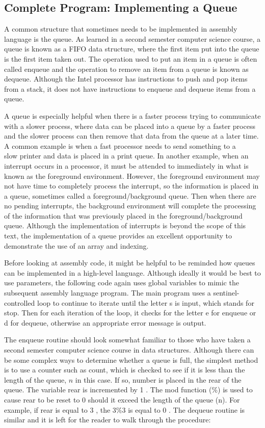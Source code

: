 \documentclass[10pt]{article}
\begin{document}
\subsection*{Complete Program: Implementing a Queue}
A common structure that sometimes needs to be implemented in assembly language is the queue. As learned in a second semester computer science course, a queue is known as a FIFO data structure, where the first item put into the queue is the first item taken out. The operation used to put an item in a queue is often called enqueue and the operation to remove an item from a queue is known as dequeue. Although the Intel processor has instructions to push and pop items from a stack, it does not have instructions to enqueue and dequeue items from a queue.

A queue is especially helpful when there is a faster process trying to communicate with a slower process, where data can be placed into a queue by a faster process and the slower process can then remove that data from the queue at a later time. A common example is when a fast processor needs to send something to a\\
slow printer and data is placed in a print queue. In another example, when an interrupt occurs in a processor, it must be attended to immediately in what is known as the foreground environment. However, the foreground environment may not have time to completely process the interrupt, so the information is placed in a queue, sometimes called a foreground/background queue. Then when there are no pending interrupts, the background environment will complete the processing of the information that was previously placed in the foreground/background queue. Although the implementation of interrupts is beyond the scope of this text, the implementation of a queue provides an excellent opportunity to demonstrate the use of an array and indexing.

Before looking at assembly code, it might be helpful to be reminded how queues can be implemented in a high-level language. Although ideally it would be best to use parameters, the following code again uses global variables to mimic the subsequent assembly language program. The main program uses a sentinel-controlled loop to continue to iterate until the letter s is input, which stands for stop. Then for each iteration of the loop, it checks for the letter e for enqueue or d for dequeue, otherwise an appropriate error message is output.

The enqueue routine should look somewhat familiar to those who have taken a second semester computer science course in data structures. Although there can be some complex ways to determine whether a queue is full, the simplest method is to use a counter such as count, which is checked to see if it is less than the length of the queue, $n$ in this case. If so, number is placed in the rear of the queue. The variable rear is incremented by 1 . The mod function (\%) is used to cause rear to be reset to 0 should it exceed the length of the queue (n). For example, if rear is equal to 3 , the $3 \% 3$ is equal to 0 . The dequeue routine is similar and it is left for the reader to walk through the procedure:
\end{document}
